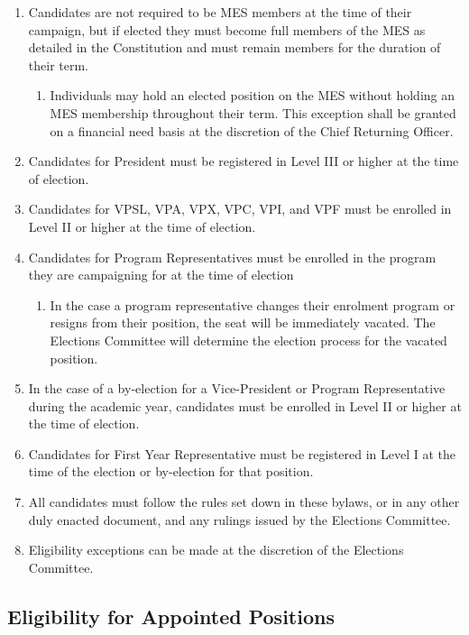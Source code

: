 \begin{enumerate}
 \item
  Candidates are not required to be MES members at the time of their
  campaign, but if elected they must become full members of the MES as
  detailed in the Constitution and must remain members for the duration
  of their term.

  \begin{enumerate}
   \item
    Individuals may hold an elected position on the MES without holding
    an MES membership throughout their term. This exception shall be
    granted on a financial need basis at the discretion of the Chief
    Returning Officer.
  \end{enumerate}
 \item
  Candidates for President must be registered in Level III or higher at
  the time of election.
 \item
  Candidates for VPSL, VPA, VPX, VPC, VPI, and VPF must be enrolled in
  Level II or higher at the time of election.
 \item
  Candidates for Program Representatives must be enrolled in the program
  they are campaigning for at the time of election

  \begin{enumerate}
   \item
    In the case a program representative changes their enrolment program
    or resigns from their position, the seat will be immediately
    vacated. The Elections Committee will determine the election process
    for the vacated position.
  \end{enumerate}
 \item
  In the case of a by-election for a Vice-President or Program
  Representative during the academic year, candidates must be enrolled
  in Level II or higher at the time of election.
 \item
  Candidates for First Year Representative must be registered in Level I
  at the time of the election or by-election for that position.
 \item
  All candidates must follow the rules set down in these bylaws, or in
  any other duly enacted document, and any rulings issued by the
  Elections Committee.
 \item
  Eligibility exceptions can be made at the discretion of the Elections
  Committee.
\end{enumerate}

\hypertarget{eligibility-for-appointed-positions}{%
 \subsection{Eligibility for Appointed
  Positions}
 \label{eligibility-for-appointed-positions}}


